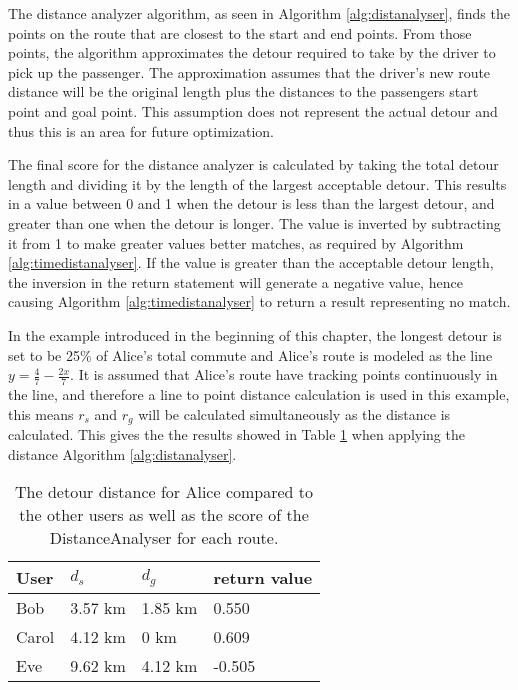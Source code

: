 The distance analyzer algorithm, as seen in Algorithm \ref{alg:distanalyser}, finds the points on the route that are closest to the start and end points.
From those points, the algorithm approximates the detour required to take by the driver to pick up the passenger.
The approximation assumes that the driver's new route distance will be the original length plus the distances to the passengers start point and goal point.
This assumption does not represent the actual detour and thus this is an area for future optimization.

The final score for the distance analyzer is calculated by taking the total detour length and dividing it by the length of the largest acceptable detour.
This results in a value between 0 and 1 when the detour is less than the largest detour, and greater than one when the detour is longer.
The value is inverted by subtracting it from 1 to make greater values better matches, as required by Algorithm \ref{alg:timedistanalyser}.
If the value is greater than the acceptable detour length, the inversion in the return statement will generate a negative value, hence causing Algorithm \ref{alg:timedistanalyser} to return a result representing no match.

In the example introduced in the beginning of this chapter, the longest detour is set to be 25\% of Alice's total commute and Alice's route is modeled as the line  $y = \frac{4}{7}-\frac{2 x}{7}$.
It is assumed that Alice's route have tracking points continuously in the line, and therefore a line to point distance calculation is used in this example, this means $r_s$ and $r_g$ will be calculated simultaneously as the distance is calculated.
This gives the the results showed in Table \ref{tbl:distance} when applying the distance  Algorithm \ref{alg:distanalyser}.

\begin{table}[!ht]
\centering
\begin{tabular}{@{}llll@{}}
\toprule
\textbf{User} 	& \textbf{$d_s$} & \textbf{$d_g$} 	& \textbf{return value} 	\\ \midrule
Bob         	& 3.57 km        & 1.85 km	    	& 0.550		 			\\
Carol         	& 4.12 km        & 0 km       		& 0.609        		\\
Eve           	& 9.62 km        & 4.12 km		    & -0.505        		\\ \bottomrule
\end{tabular}
\caption{The detour distance for Alice compared to the other users as well as the score of the DistanceAnalyser for each route.}
\label{tbl:distance}
\end{table}

